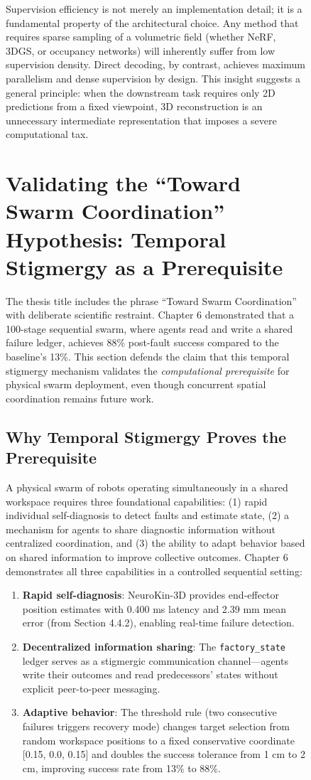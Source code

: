 \documentclass[12pt,a4paper,oneside]{report}
\begin{document}
\begin{figure}[H]
Supervision efficiency is not merely an implementation detail; it is a fundamental property of the architectural choice. Any method that requires sparse sampling of a volumetric field (whether NeRF, 3DGS, or occupancy networks) will inherently suffer from low supervision density. Direct decoding, by contrast, achieves maximum parallelism and dense supervision by design. This insight suggests a general principle: when the downstream task requires only 2D predictions from a fixed viewpoint, 3D reconstruction is an unnecessary intermediate representation that imposes a severe computational tax.

\section{Validating the ``Toward Swarm Coordination'' Hypothesis: Temporal Stigmergy as a Prerequisite}

The thesis title includes the phrase ``Toward Swarm Coordination'' with deliberate scientific restraint. Chapter 6 demonstrated that a 100-stage sequential swarm, where agents read and write a shared failure ledger, achieves 88\% post-fault success compared to the baseline's 13\%. This section defends the claim that this temporal stigmergy mechanism validates the \textit{computational prerequisite} for physical swarm deployment, even though concurrent spatial coordination remains future work.

\subsection{Why Temporal Stigmergy Proves the Prerequisite}

A physical swarm of robots operating simultaneously in a shared workspace requires three foundational capabilities: (1) rapid individual self-diagnosis to detect faults and estimate state, (2) a mechanism for agents to share diagnostic information without centralized coordination, and (3) the ability to adapt behavior based on shared information to improve collective outcomes. Chapter 6 demonstrates all three capabilities in a controlled sequential setting:
\begin{enumerate}
    \item \textbf{Rapid self-diagnosis}: NeuroKin-3D provides end-effector position estimates with 0.400 ms latency and 2.39 mm mean error (from Section 4.4.2), enabling real-time failure detection.
    \item \textbf{Decentralized information sharing}: The \texttt{factory\_state} ledger serves as a stigmergic communication channel---agents write their outcomes and read predecessors' states without explicit peer-to-peer messaging.
    \item \textbf{Adaptive behavior}: The threshold rule (two consecutive failures triggers recovery mode) changes target selection from random workspace positions to a fixed conservative coordinate [0.15, 0.0, 0.15] and doubles the success tolerance from 1 cm to 2 cm, improving success rate from 13\% to 88\%.
\end{enumerate}


\end{figure}
\end{document}
